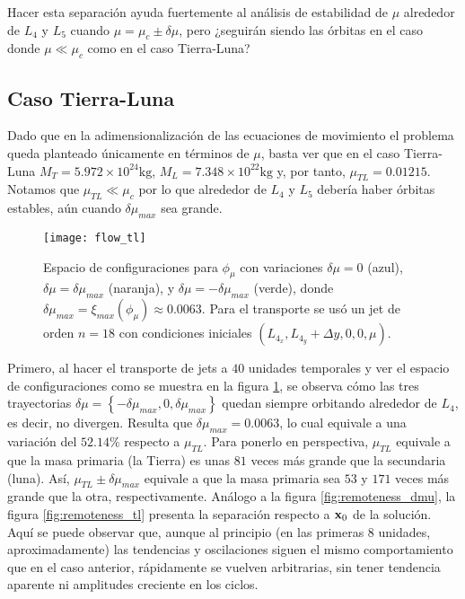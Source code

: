 Hacer esta separación ayuda fuertemente al análisis de estabilidad de $\mu$ alrededor de $L_4$ y $L_5$ cuando $\mu = \mu_c \pm \delta\mu$, pero ¿seguirán siendo las órbitas en el caso donde $\mu \ll \mu_c$ como en el caso Tierra-Luna?

\subsection{Caso Tierra-Luna}
Dado que en la adimensionalización de las ecuaciones de movimiento el problema queda planteado únicamente en términos de $\mu$, basta ver que en el caso Tierra-Luna $M_T = 5.972 \times 10^{24} \textrm{kg} $, $M_L = 7.348 \times 10^{22} \textrm{kg}$ y, por tanto, $\mu_{TL} = 0.01215$. Notamos que $\mu_{TL} \ll \mu_c$ por lo que alrededor de $L_4$ y $L_5$ debería haber órbitas estables, aún cuando $\delta\mu_{max}$ sea grande.

\begin{figure}
 \centering
 \texttt{[image: flow\_tl]}
 \caption{Espacio de configuraciones para $\phi_\mu$ con variaciones $\delta\mu = 0$ (azul), $\delta\mu = \delta\mu_{max}$ (naranja), y $\delta\mu = -\delta\mu_{max}$ (verde), donde $\delta\mu_{max} = \xi_{max}(\phi_\mu) \approx 0.0063$. Para el transporte se usó un jet de orden $n=18$ con condiciones iniciales $\left( L_{4_x}, L_{4_y} + \Delta y, 0, 0, \mu \right)$.}
 \label{fig:flow_tl}
\end{figure}

Primero, al hacer el transporte de jets a $40$ unidades temporales y ver el espacio de configuraciones como se muestra en la figura \ref{fig:flow_tl}, se observa cómo las tres trayectorias $\delta\mu = \left\lbrace -\delta\mu_{max}, 0, \delta\mu_{max} \right\rbrace$ quedan siempre orbitando alrededor de $L_4$, es decir, no divergen. Resulta que $\delta\mu_{max} = 0.0063 $, lo cual equivale a una variación del $52.14 \%$ respecto a $\mu_{TL}$. Para ponerlo en perspectiva, $\mu_{TL}$ equivale a que la masa primaria (la Tierra) es unas $81$ veces más grande que la secundaria (luna). Así, $\mu_{TL} \pm \delta\mu_{max}$ equivale a que la masa primaria sea $53$ y $171$ veces más grande que la otra, respectivamente. Análogo a la figura \ref{fig:remoteness_dmu}, la figura \ref{fig:remoteness_tl} presenta la separación respecto a $\mathbf{x}_0$ de la solución. Aquí se puede observar que, aunque al principio (en las primeras $8$ unidades, aproximadamente) las tendencias y oscilaciones siguen el mismo comportamiento que en el caso anterior, rápidamente se vuelven arbitrarias, sin tener tendencia aparente ni amplitudes creciente en los ciclos.

